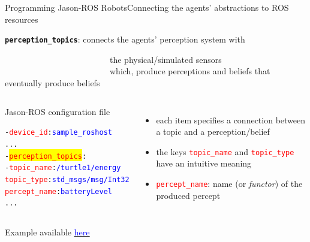 \documentclass[compress]{beamer}
\newcommand{\yamlkey}[1]{\textcolor{red}{\texttt{#1}}}
\newcommand{\yamlvalue}[1]{\textcolor{blue}{\texttt{#1}}}
\newcommand{\link}[2]{\href{#1}{\underline{\textcolor{blue}{#2}}}}
\begin{document}
\begin{frame}[fragile]{Programming Jason-ROS Robots}{Connecting the agents' abstractions to ROS resources}


\footnotesize
\texttt{{\bf perception\_topics}}: %
connects the agents' perception system with\\ 

\vspace{-.47cm}

\ \ \ \ \ \ \ \ \ \ \ \ \ \ \ \ \ \ \ \ \ \ \ \ \ the physical/simulated sensors\\

\vspace{-.5cm}
\ \ \ \ \ \ \ \ \ \ \ \ \ \ \ \ \ \ \ \ \ \ \ \ \ {\tiny which, produce perceptions and beliefs that eventually produce beliefs}

\vspace{.5cm}

\begin{columns}
 
\begin{block}{{\scriptsize Jason-ROS configuration file}}
\scriptsize
  \begin{alltt}
- \yamlkey{device_id}: \yamlvalue{sample_roshost}    
     ...
  - \colorbox{yellow}{\yamlkey{perception_topics}}:     
    - \yamlkey{topic_name}: \yamlvalue{/turtle1/energy}
      \yamlkey{topic_type}: \yamlvalue{std_msgs/msg/Int32}
      \yamlkey{percept_name}: \yamlvalue{batteryLevel} 
     ...
  \end{alltt}
\end{block}  

 \scriptsize
 \begin{itemize}
  \item each item specifies a connection between a topic and a perception/belief
  \item the keys \yamlkey{topic\_name} and \yamlkey{topic\_type} have an intuitive meaning   
  \item \yamlkey{percept\_name}: name (or \textit{functor}) of the produced percept  
 \end{itemize}

 
 
 
\end{columns}
\vfill
    {\tiny Example available \link{https://github.com/issia-2026-jason-ros/turtle-example/blob/master/src/agt/robot1.yaml}{here}}
\end{frame}
\end{document}
